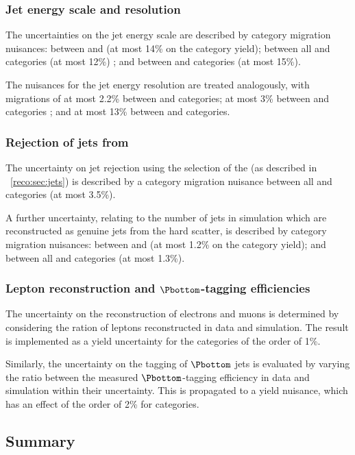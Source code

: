 \subsubsection{Jet energy scale and resolution}
The uncertainties on the jet energy scale are described by category migration nuisances: between  and  (at most 14\% on the category yield); between all \VBF and \Untagged categories (at most 12\%) ; and between \TTHTag and \Untagged categories (at most 15\%).

The nuisances for the jet energy resolution are treated analogously, with migrations of at most 2.2\% between  and  categories; at most 3\% between \VBF and \Untagged categories ; and at most 13\% between \TTHTag and \Untagged categories.

\subsubsection{Rejection of jets from \PU}
The uncertainty on \PU jet rejection using the selection of the \RMS (as described in \Sec~\ref{reco:sec:jets}) is described by a category migration nuisance between all \VBF and \Untagged categories (at most 3.5\%).

A further uncertainty, relating to the number of \PU jets in simulation which are reconstructed as genuine jets from the hard scatter, is described by category migration nuisances: between  and  (at most 1.2\% on the category yield); and between all \VBF and \Untagged categories (at most 1.3\%).

\subsubsection{Lepton reconstruction and $\Pbottom$-tagging efficiencies}
The uncertainty on the reconstruction of electrons and muons is determined by considering the ration of leptons reconstructed in data and simulation. The result is implemented as a yield uncertainty for the \TTHTag categories of the order of 1\%.

Similarly, the uncertainty on the tagging of $\Pbottom$ jets is evaluated by varying the ratio between the measured $\Pbottom$-tagging efficiency in data and simulation within their uncertainty. This is propagated to a yield nuisance, which has an effect of the order of 2\% for \TTHTag categories.

\subsection{Summary}

